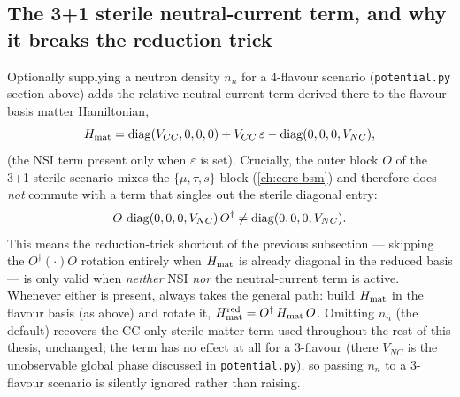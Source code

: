 \begin{theorybox}
\subsection*{The 3+1 sterile neutral-current term, and why it breaks the
reduction trick}
Optionally supplying a neutron density $n_n$ for a 4-flavour 
scenario (\texttt{potential.py} section above) adds the relative
neutral-current term derived there to the flavour-basis matter Hamiltonian,
\begin{equation}
  H_{\rm mat} = \operatorname{diag}(V_{CC},0,0,0) + V_{CC}\,\varepsilon - \operatorname{diag}(0,0,0,V_{NC}),
\end{equation}
(the NSI term present only when $\varepsilon$ is set). Crucially, the outer
block $O$ of the 3+1 sterile scenario mixes the $\{\mu,\tau,s\}$ block
(\cref{ch:core-bsm}) and therefore does \emph{not} commute with a term that
singles out the sterile diagonal entry:
\begin{equation}
  O\,\operatorname{diag}(0,0,0,V_{NC})\,O^\dagger \neq \operatorname{diag}(0,0,0,V_{NC}).
\end{equation}
This means the reduction-trick shortcut of the previous subsection ---
skipping the $O^\dagger(\cdot)O$ rotation entirely when $H_{\rm mat}$ is
already diagonal in the reduced basis --- is only valid when \emph{neither}
NSI \emph{nor} the neutral-current term is active. Whenever either is
present,  always takes the general
path: build $H_{\rm mat}$ in the flavour basis (as above) and rotate it,
$H_{\rm mat}^{\rm red} = O^\dagger\,H_{\rm mat}\,O$. Omitting $n_n$ (the
default) recovers the CC-only sterile matter term used throughout the rest
of this thesis, unchanged; the term has no effect at all for a 3-flavour
 (there $V_{NC}$ is the unobservable global phase discussed in
\texttt{potential.py}), so passing $n_n$ to a 3-flavour scenario is silently
ignored rather than raising.
\end{theorybox}

